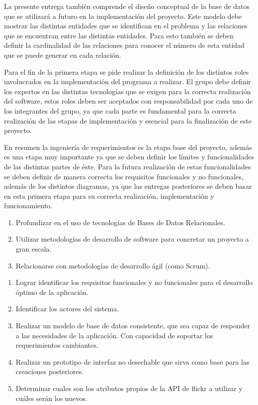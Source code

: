 \documentclass{memoria}
\begin{document}
La presente entrega también comprende el diseño conceptual de la base de datos que se utilizará a futuro en la implementación del proyecto. Este modelo debe mostrar las distintas entidades que se identifican en el problema y las relaciones que se encuentran entre las distintas entidades. Para esto también se deben definir la cardinalidad de las relaciones para conocer el número de esta entidad que se puede generar en cada relación.

Para el fin de la primera etapa se pide realizar la definición de los distintos roles involucrados en la implementación del programa a realizar. El grupo debe definir los expertos en las distintas tecnologías que se exigen para la correcta realización del software, estos roles deben ser aceptados con responsabilidad por cada uno de los integrantes del grupo, ya que cada parte es fundamental para la correcta realización de las etapas de implementación y esencial para la finalización de este proyecto.

En resumen la ingeniería de requerimientos es la etapa base del proyecto, además es una etapa muy importante ya que se deben definir los límites y funcionalidades de las distintas partes de éste. Para la futura realización de estas funcionalidades se deben definir de manera correcta los requisitos funcionales y no funcionales, además de los distintos diagramas, ya que las entregas posteriores se deben basar en esta primera etapa para su correcta realización, implementación y funcionamiento.



\begin{enumerate}
	\item Profundizar en el uso de tecnologías de Bases de Datos Relacionales.
	\item Utilizar metodologías de desarrollo de software para concretar un proyecto a gran escala.
	\item Relacionarse con metodologías de desarrollo ágil (como Scrum).
\end{enumerate}


\begin{enumerate}
	\item Lograr identificar los requisitos funcionales y no funcionales para el desarrollo óptimo de la aplicación.
	\item Identificar los actores del sistema. 
	\item Realizar un modelo de base de datos consistente, que sea capaz de responder a las necesidades de la aplicación. Con capacidad de soportar los requerimientos cambiantes.
	\item Realizar un prototipo de interfaz no desechable que sirva como base para las creaciones posteriores.
	\item Determinar cuales son los atributos propios de la API de flickr a utilizar y cuáles serán los nuevos.
\end{enumerate}
\end{document}
